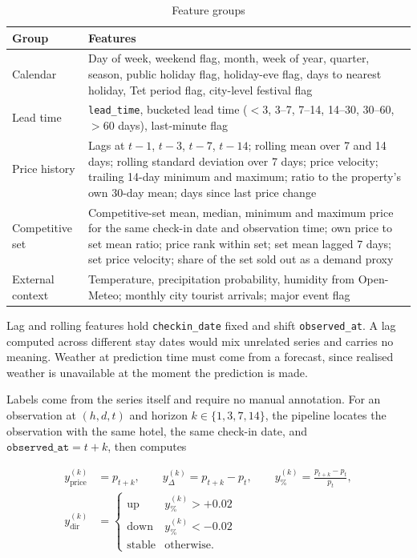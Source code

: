 \begin{table}[!htbp]
\centering
\caption{Feature groups}
\label{tab:features}
\begin{tabular}{|p{3.1cm}|p{10.5cm}|}
\hline
\textbf{Group} & \textbf{Features} \\
\hline
Calendar & Day of week, weekend flag, month, week of year, quarter, season, public holiday flag, holiday-eve flag, days to nearest holiday, Tet period flag, city-level festival flag \\
\hline
Lead time & \texttt{lead\_time}, bucketed lead time ($<$3, 3--7, 7--14, 14--30, 30--60, $>$60 days), last-minute flag \\
\hline
Price history & Lags at $t-1$, $t-3$, $t-7$, $t-14$; rolling mean over 7 and 14 days; rolling standard deviation over 7 days; price velocity; trailing 14-day minimum and maximum; ratio to the property's own 30-day mean; days since last price change \\
\hline
Competitive set & Competitive-set mean, median, minimum and maximum price for the same check-in date and observation time; own price to set mean ratio; price rank within set; set mean lagged 7 days; set price velocity; share of the set sold out as a demand proxy \\
\hline
External context & Temperature, precipitation probability, humidity from Open-Meteo; monthly city tourist arrivals; major event flag \\
\hline
\end{tabular}
\end{table}

Lag and rolling features hold \texttt{checkin\_date} fixed and shift \texttt{observed\_at}. A lag computed across different stay dates would mix unrelated series and carries no meaning. Weather at prediction time must come from a forecast, since realised weather is unavailable at the moment the prediction is made.

Labels come from the series itself and require no manual annotation. For an observation at $(h, d, t)$ and horizon $k \in \{1,3,7,14\}$, the pipeline locates the observation with the same hotel, the same check-in date, and $\texttt{observed\_at} = t+k$, then computes

\begin{align*}
y^{(k)}_{\text{price}} &= p_{t+k}, \qquad
y^{(k)}_{\Delta} = p_{t+k} - p_t, \qquad
y^{(k)}_{\%} = \frac{p_{t+k} - p_t}{p_t},\\[4pt]
y^{(k)}_{\text{dir}} &= \begin{cases}
\text{up} & y^{(k)}_{\%} > +0.02\\
\text{down} & y^{(k)}_{\%} < -0.02\\
\text{stable} & \text{otherwise.}
\end{cases}
\end{align*}

